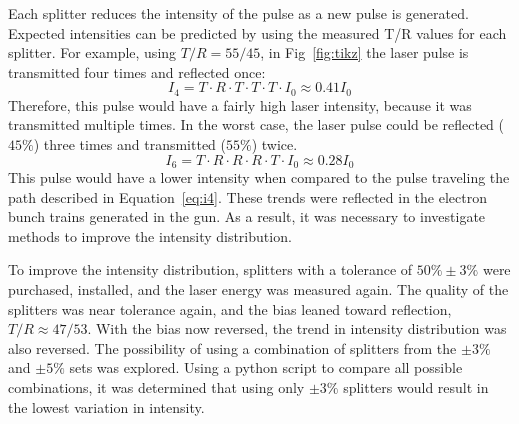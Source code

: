 Each splitter reduces the intensity of the pulse as a new pulse is generated. Expected intensities
can be predicted by using the measured T/R values for each splitter. For example, using $T/R=55/45$,
in Fig~\ref{fig:tikz} the laser pulse is transmitted four times and reflected once: 
\begin{equation}\label{eq:i4}
I_4 =  T \cdot R \cdot T \cdot T \cdot T \cdot I_0 \approx 0.41 I_0
\end{equation}
Therefore, this pulse would have a fairly high laser intensity, because it was transmitted multiple times. 
In the worst case, the laser pulse could be reflected ($45\%$) three times and transmitted ($55\%$) twice. 
\begin{equation}\label{eq:i6}
I_6 =  T \cdot R \cdot R \cdot R \cdot T \cdot  I_0 \approx 0.28 I_0
\end{equation}
This pulse would have a lower intensity when compared to the pulse traveling the path described in Equation~\ref{eq:i4}.
These trends were reflected in the electron bunch trains generated in the gun.
As a result, it was necessary to investigate methods to improve the intensity distribution. 

To improve the intensity distribution, splitters with a tolerance of $50\%\pm3\%$ were purchased, 
installed, and the laser energy was measured again. The quality of the splitters was near tolerance 
again, and the bias leaned toward reflection, $T/R \approx 47/53$. With the bias now reversed, 
the trend in intensity distribution was also reversed. The possibility of using a combination 
of splitters from the $\pm3\%$ and $\pm5\%$ sets was explored. 
Using a python script to compare all possible combinations, it was determined that using only 
$\pm3\%$ splitters would result in the lowest variation in intensity. 

